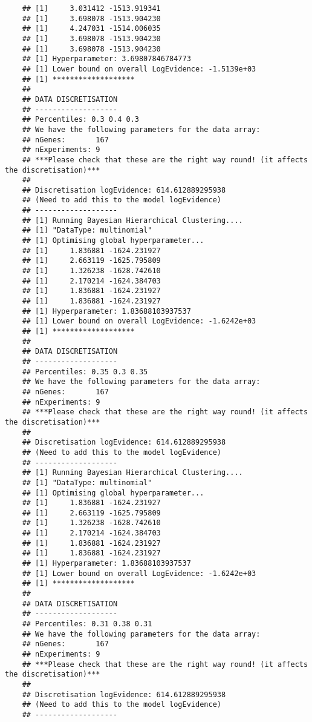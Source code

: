 \begin{verbatim}
    ## [1]     3.031412 -1513.919341
    ## [1]     3.698078 -1513.904230
    ## [1]     4.247031 -1514.006035
    ## [1]     3.698078 -1513.904230
    ## [1]     3.698078 -1513.904230
    ## [1] Hyperparameter: 3.69807846784773
    ## [1] Lower bound on overall LogEvidence: -1.5139e+03
    ## [1] *******************
    ## 
    ## DATA DISCRETISATION
    ## -------------------
    ## Percentiles: 0.3 0.4 0.3 
    ## We have the following parameters for the data array:
    ## nGenes:       167
    ## nExperiments: 9
    ## ***Please check that these are the right way round! (it affects the discretisation)***
    ## 
    ## Discretisation logEvidence: 614.612889295938
    ## (Need to add this to the model logEvidence)
    ## -------------------
    ## [1] Running Bayesian Hierarchical Clustering....
    ## [1] "DataType: multinomial"
    ## [1] Optimising global hyperparameter...
    ## [1]     1.836881 -1624.231927
    ## [1]     2.663119 -1625.795809
    ## [1]     1.326238 -1628.742610
    ## [1]     2.170214 -1624.384703
    ## [1]     1.836881 -1624.231927
    ## [1]     1.836881 -1624.231927
    ## [1] Hyperparameter: 1.83688103937537
    ## [1] Lower bound on overall LogEvidence: -1.6242e+03
    ## [1] *******************
    ## 
    ## DATA DISCRETISATION
    ## -------------------
    ## Percentiles: 0.35 0.3 0.35 
    ## We have the following parameters for the data array:
    ## nGenes:       167
    ## nExperiments: 9
    ## ***Please check that these are the right way round! (it affects the discretisation)***
    ## 
    ## Discretisation logEvidence: 614.612889295938
    ## (Need to add this to the model logEvidence)
    ## -------------------
    ## [1] Running Bayesian Hierarchical Clustering....
    ## [1] "DataType: multinomial"
    ## [1] Optimising global hyperparameter...
    ## [1]     1.836881 -1624.231927
    ## [1]     2.663119 -1625.795809
    ## [1]     1.326238 -1628.742610
    ## [1]     2.170214 -1624.384703
    ## [1]     1.836881 -1624.231927
    ## [1]     1.836881 -1624.231927
    ## [1] Hyperparameter: 1.83688103937537
    ## [1] Lower bound on overall LogEvidence: -1.6242e+03
    ## [1] *******************
    ## 
    ## DATA DISCRETISATION
    ## -------------------
    ## Percentiles: 0.31 0.38 0.31 
    ## We have the following parameters for the data array:
    ## nGenes:       167
    ## nExperiments: 9
    ## ***Please check that these are the right way round! (it affects the discretisation)***
    ## 
    ## Discretisation logEvidence: 614.612889295938
    ## (Need to add this to the model logEvidence)
    ## -------------------

\end{verbatim}

